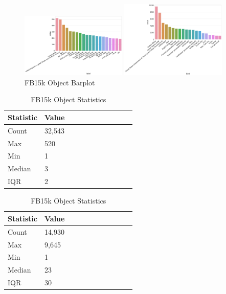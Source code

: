 
\begin{figure}[H]
	\parbox{.5\linewidth}{
   		\caption{WN18 Object Barplot}
   		\centering
    		\includegraphics[width=0.45\textwidth, height=0.2\textheight]{WN18_Object_Counts}
		}
	\hfill
	\parbox{.5\linewidth}{
		\caption{FB15k Object Barplot}
   		\centering
		\includegraphics[width=0.45\textwidth, height=0.2\textheight]{FB15k_Object_Counts}
		}
\end{figure}


\begin{table}[H]
	\parbox{.5\linewidth}{
		\caption{WN18 Object Statistics}
		\centering
		\begin{tabular}{lllllllllll}
  			\textbf{Statistic} & \textbf{Value}  \\
  			\hline
			Count & 32,543 \\
			Max & 520 \\
			Min & 1 \\
  			Median & 3 \\
  			IQR & 2 \\
		\end{tabular}
		}
	\hfill
	\parbox{.5\linewidth}{
		\caption{FB15k Object Statistics}
		\centering
		\begin{tabular}{lllllllllll}
  			\textbf{Statistic} & \textbf{Value}  \\
  			\hline
			Count & 14,930 \\
			Max & 9,645 \\
			Min & 1 \\
  			Median & 23 \\
  			IQR & 30 \\
		\end{tabular}
		}
\end{table}

